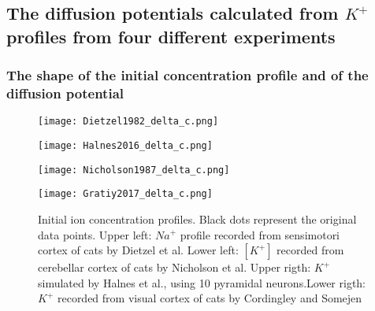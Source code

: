\documentclass{article}
\begin{document}
\subsection{The diffusion potentials calculated from $K^+$ profiles from four different experiments}\label{diffusion potentials}
\subsubsection{The shape of the initial concentration profile and of the diffusion potential}

\begin{figure}[!tbp]
  \centering
  \begin{minipage}[b]{0.45\textwidth}
    \texttt{[image: Dietzel1982\_delta\_c.png]}
  \end{minipage}
  \hfill
  \begin{minipage}[b]{0.45\textwidth}
    \texttt{[image: Halnes2016\_delta\_c.png]}
  \end{minipage}
    \begin{minipage}[b]{0.45\textwidth}
    \texttt{[image: Nicholson1987\_delta\_c.png]}
  \end{minipage}
  \hfill
  \begin{minipage}[b]{0.45\textwidth}
    \texttt{[image: Gratiy2017\_delta\_c.png]}
  \end{minipage}
  \caption{Initial ion concentration profiles. Black dots represent the original data points. Upper left: $Na^+$ profile recorded from sensimotori cortex of cats by Dietzel et al. Lower left: $[K^+]$  recorded from cerebellar cortex of cats by Nicholson et al. Upper rigth:  $K^+$ simulated by Halnes et al., using 10 pyramidal neurons.Lower rigth: $K^+$ recorded from visual cortex of cats by Cordingley and Somejen }
  \label{fig:initial concentrations}
\end{figure} 
\end{document}
